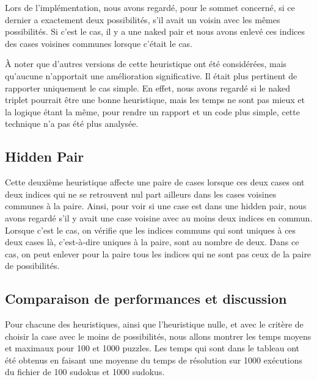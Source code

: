\documentclass[8pt]{article}
\begin{document}
Lors de l'implémentation, nous avons regardé, pour le sommet concerné,
si ce dernier a exactement deux possibilités, s'il avait un voisin
avec les mêmes possibilités. Si c'est le cas, il y a une naked pair
et nous avons enlevé ces indices des cases voisines communes lorsque
c'était le cas.

À noter que d'autres versions de cette heuristique ont été considérées,
mais qu'aucune n'apportait une amélioration significative. Il était
plus pertinent de rapporter uniquement le cas simple. En effet, nous avons
regardé si le naked triplet pourrait être une bonne heuristique,
mais les temps ne sont pas mieux et la logique étant la même, pour
rendre un rapport et un code plus simple, cette technique n'a pas été
plus analysée.

\subsection{Hidden Pair}
Cette deuxième heuristique affecte une paire de cases lorsque
ces deux cases ont deux indices qui ne se retrouvent nul part ailleurs
dans les cases voisines communes à la paire. Ainsi, pour voir si
une case est dans une hidden pair, nous avons regardé s'il y avait
une case voisine avec au moins deux indices en commun. Lorsque c'est
le cas, on vérifie que les indices communs qui sont uniques à ces
deux cases là, c'est-à-dire uniques à la paire, sont au nombre de
deux. Dans ce cas, on peut enlever pour la paire tous les indices
qui ne sont pas ceux de la paire de possibilités.

\subsection{Comparaison de performances et discussion}
Pour chacune des heuristiques, ainsi que l'heuristique nulle, et avec
le critère de choisir la case avec le moins de possibilités, nous
allons montrer les temps moyens et maximaux pour 100 et 1000 puzzles.
Les temps qui sont dans le tableau ont été obtenus en faisant une
moyenne du temps de résolution sur 1000 exécutions du fichier de 100 sudokus et
1000 sudokus.
\end{document}
